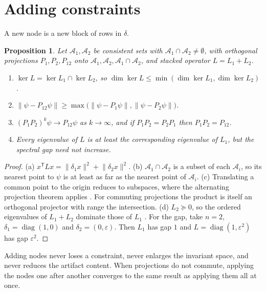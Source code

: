 \documentclass[11pt,letterpaper]{article}
\theoremstyle{plain}
\newtheorem{proposition}{Proposition}
\theoremstyle{definition}
\theoremstyle{remark}
\newcommand{\norm}[1]{\lVert #1\rVert}
\newcommand{\tr}{^{\mathsf T}}
\begin{document}
\section{Adding constraints}\label{sec:nodes}

A new node is a new block of rows in $\delta$.

\begin{proposition}\label{prop:nodes}
Let $\mathcal{A}_1,\mathcal{A}_2$ be consistent sets with $\mathcal{A}_1\cap\mathcal{A}_2\neq\emptyset$, with orthogonal projections $P_1,P_2,P_{12}$ onto $\mathcal{A}_1,\mathcal{A}_2,\mathcal{A}_1\cap\mathcal{A}_2$, and stacked operator $L=L_1+L_2$.
\begin{enumerate}[label=(\alph*)]
\item $\ker L=\ker L_1\cap\ker L_2$, so $\dim\ker L\le\min(\dim\ker L_1,\dim\ker L_2)$.
\item $\norm{\psi-P_{12}\psi}\ge\max\bigl(\norm{\psi-P_1\psi},\norm{\psi-P_2\psi}\bigr)$.
\item $(P_1P_2)^{k}\psi\to P_{12}\psi$ as $k\to\infty$, and if $P_1P_2=P_2P_1$ then $P_1P_2=P_{12}$.
\item Every eigenvalue of $L$ is at least the corresponding eigenvalue of $L_1$, but the spectral gap need not increase.
\end{enumerate}
\end{proposition}

\begin{proof}
(a) $x\tr Lx=\norm{\delta_1x}^{2}+\norm{\delta_2x}^{2}$. (b) $\mathcal{A}_1\cap\mathcal{A}_2$ is a subset of each $\mathcal{A}_i$, so its nearest point to $\psi$ is at least as far as the nearest point of $\mathcal{A}_i$. (c) Translating a common point to the origin reduces to subspaces, where the alternating projection theorem applies \cite{vonneumann,halperin}. For commuting projections the product is itself an orthogonal projector with range the intersection. (d) $L_2\succeq0$, so the ordered eigenvalues of $L_1+L_2$ dominate those of $L_1$ \cite{hornjohnson}. For the gap, take $n=2$, $\delta_1=\operatorname{diag}(1,0)$ and $\delta_2=(0,\varepsilon)$. Then $L_1$ has gap $1$ and $L=\operatorname{diag}(1,\varepsilon^{2})$ has gap $\varepsilon^{2}$. \qedhere
\end{proof}

Adding nodes never loses a constraint, never enlarges the invariant space, and never reduces the artifact content. When projections do not commute, applying the nodes one after another converges to the same result as applying them all at once.
\end{document}
